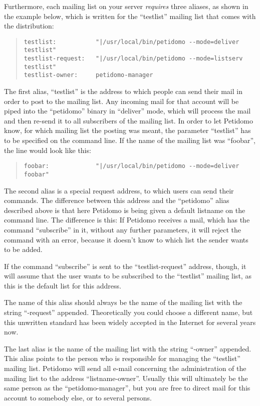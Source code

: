 \documentclass[a4paper,11pt]{scrreprt}
\begin{document}
Furthermore, each mailing list on your server \emph{requires} three
aliases, as shown in the example below, which is written for the
``testlist'' mailing list that comes with the distribution:
\begin{quote}
\begin{verbatim}
testlist:           "|/usr/local/bin/petidomo --mode=deliver testlist"
testlist-request:   "|/usr/local/bin/petidomo --mode=listserv testlist"
testlist-owner:     petidomo-manager
\end{verbatim}
\end{quote}

The first alias, ``testlist'' is the address to which people can send
their mail in order to post to the mailing list. Any incoming mail for
that account will be piped into the ``petidomo'' binary in ``deliver''
mode, which will process the mail and then re-send it to all
subscribers of the mailing list. In order to let Petidomo know, for
which mailing list the posting was meant, the parameter ``testlist''
has to be specified on the command line. If the name of the mailing
list was ``foobar'', the line would look like this:
\begin{quote}
\begin{verbatim}
foobar:             "|/usr/local/bin/petidomo --mode=deliver foobar"
\end{verbatim}
\end{quote}

The second alias is a special request address, to which users can send
their commands. The difference between this address and the
``petidomo'' alias described above is that here Petidomo is being
given a default listname on the command line. The difference is this:
If Petidomo receives a mail, which has the command ``subscribe'' in
it, without any further parameters, it will reject the command with an
error, because it doesn't know to which list the sender wants to be
added.

If the command ``subscribe'' is sent to the ``testlist-request''
address, though, it will assume that the user wants to be subscribed
to the ``testlist'' mailing list, as this is the default list for this
address.

The name of this alias should always be the name of the mailing list
with the string ``-request'' appended. Theoretically you could choose
a different name, but this unwritten standard has been widely accepted
in the Internet for several years now.

The last alias is the name of the mailing list with the string
``-owner'' appended. This alias points to the person who is
responsible for managing the ``testlist'' mailing list. Petidomo
will send all e-mail concerning the administration of the mailing list
to the address ``listname-owner''. Usually this will ultimately be the
same person as the ``petidomo-manager'', but you are free to direct
mail for this account to somebody else, or to several persons.
\end{document}
